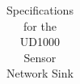 \begin{table}[H]
\begin{tabular}{| l | l | p{4.5cm} |}
	\end{tabular}
	\caption{Specifications for the UD1000 Sensor Network Sink \cite{UD1000}}
	\label{tab:UD1000-spec}
\end{table}
